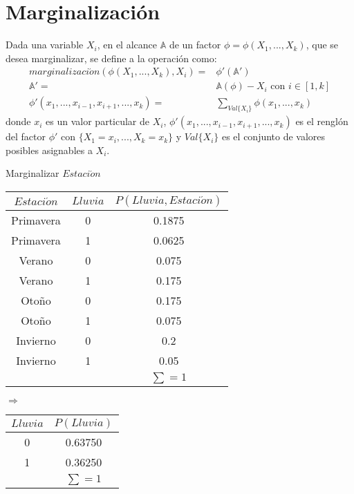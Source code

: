 \section{Marginalización}

\begin{definition}[Marginalización]
Dada una variable $X_i$, en el alcance $\mathbb{A}$ de un factor $\phi = \phi(X_1,...,X_k)$, que se desea marginalizar, se define a la operación como:
\begin{align}
 marginalizaci\acute{o}n(\phi(X_1,...,X_k), X_i) =& \phi'(\mathbb{A'}) \\
 \mathbb{A'} =& \mathbb{A}(\phi) - X_i \text{ con } i \in [1,k] \\
 \phi'(x_1,...,x_{i-1},x_{i+1},...,x_k) =& \sum_{Val\{X_i\}} \phi(x_1,...,x_k)
\end{align}
donde $x_i$ es un valor particular de $X_i$, $\phi'(x_1,...,x_{i-1},x_{i+1},...,x_k)$ es el renglón del factor $\phi'$ con $\{X_1 = x_i,..., X_k=x_k\}$ y $Val\{X_i\}$ es el conjunto de valores posibles asignables a $X_i$.
\end{definition}

\begin{example}{Marginalizar $Estaci\acute{o}n$}
\begin{center}
\begin{tabular}{cc|c}
 $Estaci\acute{o}n$ & $Lluvia$ & $P(Lluvia,Estaci\acute{o}n)$ \\ \toprule
 Primavera & 0 & 0.1875 \\
 Primavera & 1 & 0.0625 \\
 Verano & 0 & 0.075 \\
 Verano & 1 & 0.175 \\
 Otoño & 0 & 0.175 \\
 Otoño & 1 & 0.075 \\
 Invierno & 0 & 0.2 \\
 Invierno & 1 & 0.05 \\
 \multicolumn{2}{c}{}  & $\sum=1$
\end{tabular}$\Rightarrow$
\begin{tabular}{c|c}
 $Lluvia$ & $P(Lluvia)$ \\ \toprule
 0 & 0.63750 \\
 1 & 0.36250 \\
 \multicolumn{1}{c}{}  & $\sum=1$
\end{tabular}
\end{center}
\end{example}


